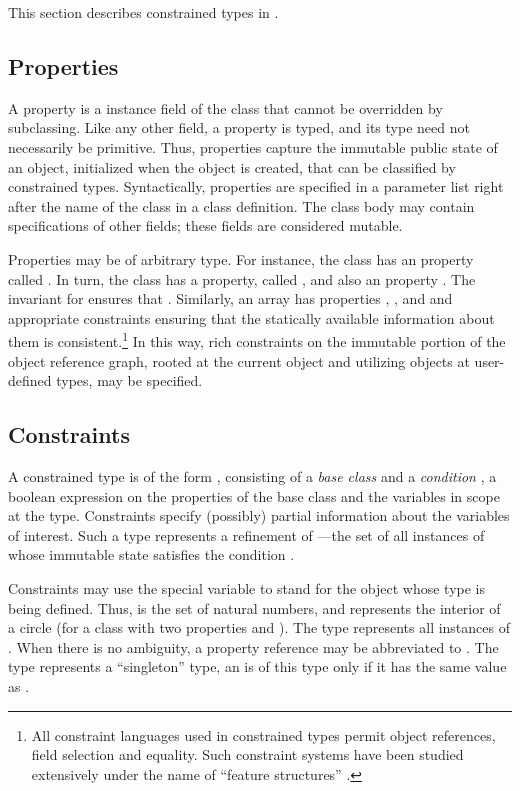 This section describes constrained types in \Xten{}.

\subsection{Properties}

A property is a   instance field of the
class that cannot be overridden by subclassing. Like any other field,
a property is typed, and its type need not necessarily be
primitive. Thus, properties capture the immutable public state of an
object, initialized when the object is created, that can be
classified by constrained types. Syntactically, properties are
specified in a parameter list right after the name of the class in a
class definition. The class body may contain specifications of other
fields; these fields are considered mutable.

Properties may be of arbitrary type. For instance, the class
 has an  property called . In turn, the
class  has a  property, called , and
also an  property .  The invariant for 
ensures that . Similarly, an array has
properties , , and 
and appropriate constraints ensuring that the statically available
information about them is consistent.\footnote{All constraint
languages used in constrained types permit object references, field
selection and equality. Such constraint systems have been studied
extensively under the name of ``feature structures''
\cite{feature-structures}.}
%
In this way, rich  
constraints on the immutable portion of
the object reference graph, rooted at the current object and utilizing
objects at user-defined types, may be specified.

\subsection{Constraints}
A constrained type is of the form , consisting of a
{\em base class}  and a {\em condition} , a
boolean expression on the properties of the base class and the
 variables in scope at the type.  Constraints specify
(possibly) partial information about the variables of interest.
Such a type represents a refinement of ---the set of all
instances of  whose immutable state satisfies the
condition .

Constraints may use the special variable  to stand for
the object whose type is being defined. Thus,  is
the set of natural numbers, and 
represents the interior of a circle (for a class  with two
 properties  and ). The type  represents all instances of . When there is no
ambiguity, a property reference  may be abbreviated
to . The type  represents a ``singleton'' type, an
 is of this type only if it has the same value as .

